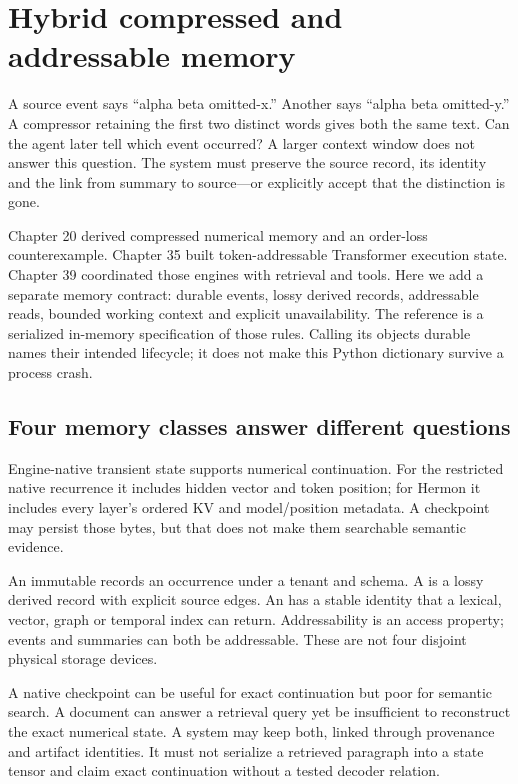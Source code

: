 \chapter{Hybrid compressed and addressable memory}
\label{evod40:chapter}

A source event says ``alpha beta omitted-x.'' Another says ``alpha beta
omitted-y.'' A compressor retaining the first two distinct words gives both
the same text. Can the agent later tell which event occurred? A larger context
window does not answer this question. The system must preserve the source
record, its identity and the link from summary to source---or explicitly accept
that the distinction is gone.

Chapter 20 derived compressed numerical memory and an order-loss
counterexample. Chapter 35 built token-addressable Transformer execution
state. Chapter 39 coordinated those engines with retrieval and tools.
Here we add a separate memory contract: durable events, lossy derived records,
addressable reads, bounded working context and explicit unavailability.
The reference is a serialized in-memory specification of those rules.
Calling its objects durable names their intended lifecycle; it does not make
this Python dictionary survive a process crash.

\section{Four memory classes answer different questions}
\label{evod40:classes}
Engine-native transient state supports numerical continuation. For the
restricted native recurrence it includes hidden vector and token position;
for Hermon it includes every layer's ordered KV and model/position metadata.
A checkpoint may persist those bytes, but that does not make them searchable
semantic evidence.

An immutable  records an occurrence under a tenant and
schema. A  is a lossy derived record with explicit source edges.
An  has a stable identity that a lexical, vector,
graph or temporal index can return. Addressability is an access property;
events and summaries can both be addressable. These are not four disjoint
physical storage devices.

A native checkpoint can be useful for exact continuation but poor for
semantic search. A document can answer a retrieval query yet be insufficient
to reconstruct the exact numerical state. A system may keep both, linked
through provenance and artifact identities. It must not serialize a retrieved
paragraph into a state tensor and claim exact continuation without a tested
decoder relation.

